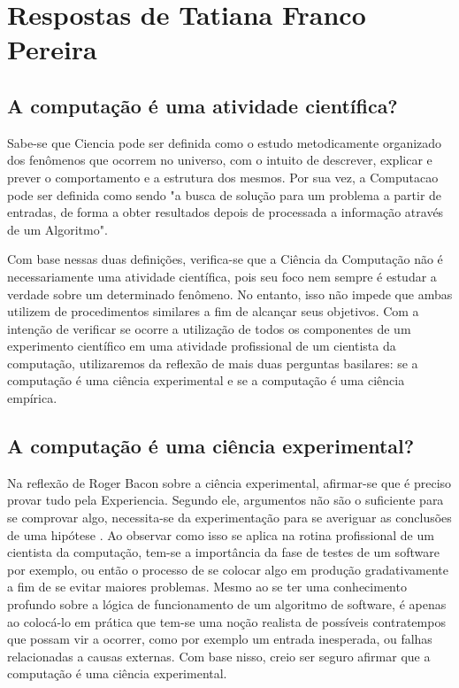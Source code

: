 \section{Respostas de Tatiana Franco Pereira\label{tarefa-Tatianafp-componentes-eperimento}}

\subsection{A computação é uma atividade científica? }

Sabe-se que \gls{Ciencia} pode ser definida como o estudo metodicamente organizado dos fenômenos que ocorrem no universo, com o intuito de descrever, explicar e prever o comportamento e a estrutura dos mesmos. Por sua vez, a \gls{Computacao} pode ser definida como sendo "a busca de solução para um problema a partir de entradas, de forma a obter resultados depois de processada a informação através de um \gls{Algoritmo}". 

Com base nessas duas definições, verifica-se que a Ciência da Computação não é necessariamente uma atividade científica, pois seu foco nem sempre é estudar a verdade sobre um determinado fenômeno. No entanto, isso não impede que ambas utilizem de procedimentos similares a fim de alcançar seus objetivos. Com a intenção de verificar se ocorre a utilização de todos os componentes de um experimento científico em uma atividade profissional de um cientista da computação, utilizaremos da reflexão de mais duas perguntas basilares: se a computação é uma ciência experimental e se a computação é uma ciência empírica.  

\subsection{A computação é uma ciência experimental? }

Na reflexão de Roger Bacon sobre a ciência experimental, afirmar-se que é preciso provar tudo pela \gls{Experiencia}. Segundo ele, argumentos não são o suficiente para se comprovar algo, necessita-se da experimentação para se averiguar as conclusões de uma hipótese \cite{bacon_opus_1268}. Ao observar como isso se aplica na rotina profissional de um cientista da computação, tem-se a importância da fase de testes de um software por exemplo, ou então o processo de se colocar algo em produção gradativamente a fim de se evitar maiores problemas. Mesmo ao se ter uma conhecimento profundo sobre a lógica de funcionamento de um algoritmo de software, é apenas ao colocá-lo em prática que tem-se uma noção realista de possíveis contratempos que possam vir a ocorrer, como por exemplo um entrada inesperada, ou falhas relacionadas a causas externas. Com base nisso, creio ser seguro afirmar que a computação é uma ciência experimental.

